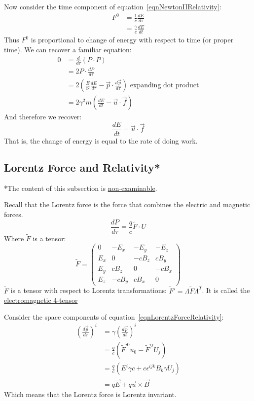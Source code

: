 \documentclass[../Main.tex]{subfiles}
\begin{document}
Now consider the time component of equation~\ref{eqnNewtonIIRelativity}:
\begin{align*}
    F^0 &= \frac{1}{c} \frac{dE}{d\tau} \\
    &= \frac{\gamma}{c} \frac{dE}{dt}
\end{align*}
Thus $F^0$ is proportional to change of energy with respect to time (or proper time). We can recover a familiar equation:
\begin{align*}
    0 &= \frac{d}{d\tau} (P \cdot P) \\
    &= 2P \cdot \frac{dP}{d\tau} \\
    &= 2\left(\frac{E}{c^2} \frac{dE}{d\tau} - \vec{p} \cdot \frac{d\vec{p}}{d\tau}\right) \text{ expanding dot product} \\
    &= 2\gamma^2 m\left(\frac{dE}{dt} - \vec{u} \cdot \vec{f}\right)
\end{align*}
And therefore we recover:
\begin{equation}
    \frac{dE}{dt} = \vec{u} \cdot \vec{f}
    \label{eqnWorkEnergyRelativity}
\end{equation}
That is, the change of energy is equal to the rate of doing work.
\subsection{Lorentz Force and Relativity*}
*The content of this subsection is \underline{non-examinable}.

Recall that the Lorentz force is the force that combines the electric and magnetic forces.
\begin{equation}
    \frac{dP}{d\tau} = \frac{q}{c} \tilde{F} \cdot U
    \label{eqnLorentzForceRelativity}
\end{equation}
Where $\tilde{F}$ is a tensor:
\begin{equation*}
    \tilde{F} =
    \begin{pmatrix}
    0 & -E_x & -E_y & -E_z \\
    E_x & 0 & -cB_z & cB_y \\
    E_y & cB_z & 0 & -cB_x \\
    E_z & -cB_y & cB_x & 0
    \end{pmatrix}
\end{equation*}
$\tilde{F}$ is a tensor with respect to Lorentz transformations: $\tilde{F}' = \Lambda \tilde{F} \Lambda^T$. It is called the \underline{electromagnetic 4-tensor}

Consider the space components of equation~\ref{eqnLorentzForceRelativity}:
\begin{align*}
    \left(\frac{d\vec{p}}{d\tau}\right)^i &= \gamma \left(\frac{d\vec{p}}{dt}\right)^i \\
    &= \frac{q}{c} \left(\tilde{F}^{i0} u_0 - \tilde{F}^{ij}U_j\right) \\
    &= \frac{q}{c} \left(E^i \gamma c + c\epsilon^{ijk} B_k \gamma U_j\right) \\
    &= q\vec{E} + q\vec{u} \times \vec{B}
\end{align*}
Which means that the Lorentz force is Lorentz invariant.
\end{document}
